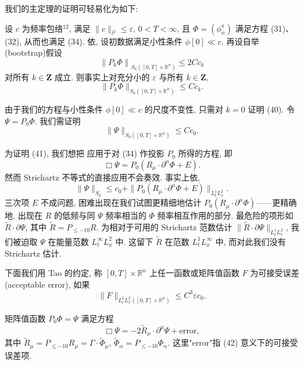 我们的主定理的证明可轻易化为如下:
\begin{proposition}[主命题]\label{prop:2.22}
设 $c$ 为频率包络$^{12}$, 满足 $\|c\|_{l^2} \leq \varepsilon$, $0 < T < \infty$, 且 $\Phi = (\phi_\alpha^a)$ 满足方程 (31)、(32), 从而也满足 (34). 依, 设初数据满足小性条件 $\phi[0] \ll c$. 再设自举(bootstrap)假设
\[
\left\|P_{k}\Phi\right\|_{S_{k}([0,T]\times\mathbb{R}^{n})}\leq2C c_{k}
\]
对所有 $k \in \mathbf{Z}$ 成立. 则事实上对充分小的 $\varepsilon$ 与所有 $k \in \mathbf{Z}$,
\[
\|P_{k}\Phi\|_{S_{k}([0,T]\times\mathbb{R}^{n})}\leq C c_{k}.
\]
\end{proposition}

\begin{remark}\label{rem:2.23}
由于我们的方程与小性条件 $\phi[0] \ll c$ 的尺度不变性, 只需对 $k = 0$ 证明 (40). 令 $\Psi = P_0\Phi$. 我们需证明
\[
\|\Psi\|_{S_{0}([0,T]\times\mathbb{R}^{n})}\leq C c_{0}.
\]
\end{remark}

\begin{remark}\label{rem:2.24}
为证明 (41), 我们想把 应用于对 (34) 作投影 $P_{0}$ 所得的方程, 即
\[
\Box\Psi=P_{0}(R_{\mu}\cdot\partial^{\mu}\Phi+E).
\]
然而 Strichartz 不等式的直接应用不会奏效. 事实上依,
\[
\|\Psi\|_{S_{0}}\leq c_{0}+\|P_{0}(R_{\mu}\cdot\partial^{\mu}\Phi+E)\|_{L_{t}^{1}L_{x}^{2}}.
\]
三次项 $E$ 不成问题, 困难出现在我们试图更精细地估计 $P_0(R_\mu \cdot \partial^\mu \Phi)$------更精确地, 出现在 $R$ 的低频与同 $\Psi$ 频率相当的 $\Phi$ 频率相互作用的部分. 最危险的项形如 $\tilde{R} \cdot \partial \Psi$, 其中 $\tilde{R} = P_{\leq -10} R$. 为相对于可用的 Strichartz 范数估计 $\|\tilde{R} \cdot \partial \Psi\|_{L_t^1 L_x^2}$, 我们被迫取 $\Psi$ 在能量范数 $L_t^\infty L_x^2$ 中. 这留下 $\tilde{R}$ 在范数 $L_t^1 L_x^\infty$ 中, 而对此我们没有 Strichartz 估计.\end{remark}

\begin{definition}\label{def:2.25}
下面我们用 Tao 的约定, 称 $[0, T] \times \mathbb{R}^n$ 上任一函数或矩阵值函数 $F$ 为可接受误差(acceptable error), 如果
\[
\|F\|_{L_{t}^{1}L_{x}^{2}([0,T]\times\mathbb{R}^{n})}\leq C^{3}\varepsilon c_{0}.
\]
\end{definition}

\begin{proposition}\label{prop:2.26}
矩阵值函数 $P_{0}\Phi = \Psi$ 满足方程
\[
\Box\Psi=-2\tilde{R}_{\mu}\cdot\partial^{\mu}\Psi+\text{error},
\]
其中 $\tilde{R}_{\mu} = P_{\leq -10} R_{\mu} = \Gamma \cdot \tilde{\Phi}_{\mu}$, $\tilde{\Phi}_{\alpha} = P_{\leq -10} \Phi_{\alpha}$. 这里"error"指 (42) 意义下的可接受误差项.\end{proposition}

